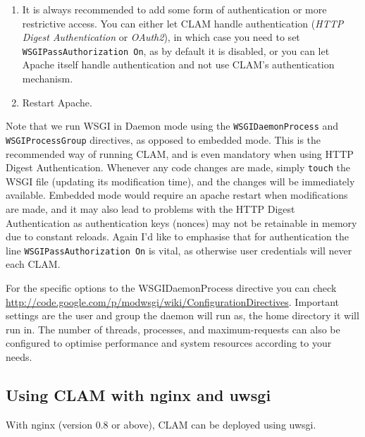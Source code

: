 \documentclass[a4paper,12pt,twoside,openright]{report}
\begin{document}
\begin{enumerate}[leftmargin=5mm]
\item It is always recommended to add some form of authentication or more restrictive
access. You can either let CLAM handle authentication (\emph{HTTP Digest
Authentication} or \emph{OAuth2}), in which case you need to set \texttt{WSGIPassAuthorization
On}, as by default it is disabled, or you can let Apache itself handle
authentication and not use CLAM's authentication mechanism.  
\item Restart Apache. 
\end{enumerate}

Note that we run WSGI in Daemon mode using the \texttt{WSGIDaemonProcess} and
\texttt{WSGIProcessGroup} directives, as opposed to embedded mode. This is the
recommended way of running CLAM, and is even mandatory when using HTTP Digest
Authentication. Whenever any code changes are made, simply
\texttt{touch} the WSGI file (updating its modification time), and the changes
will be immediately available. Embedded mode would require an apache restart
when modifications are made, and it may also lead to problems with the HTTP
Digest Authentication as authentication keys (nonces) may not be retainable in
memory due to constant reloads.  Again I'd like to emphasise that for
authentication the line \texttt{WSGIPassAuthorization On} is vital, as
otherwise user credentials will never each CLAM.

For the specific options to the WSGIDaemonProcess directive you can check
\url{http://code.google.com/p/modwsgi/wiki/ConfigurationDirectives}.
Important settings are the user and group the daemon will run as, the home
directory it will run in. The number of threads, processes, and
maximum-requests can also be configured to optimise performance and system
resources according to your needs.

\subsection{Using CLAM with nginx and uwsgi}

With nginx (version 0.8 or above), CLAM can be deployed using uwsgi.
\end{document}
